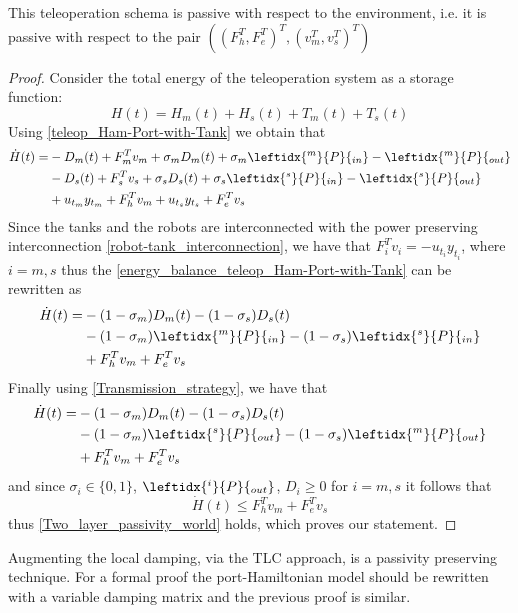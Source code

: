 This teleoperation schema is passive with respect to the environment, i.e. it is passive with respect to the pair $\left(\left(F^{T}_{h} , F^{T}_{e}\right)^T, \left( v^{T}_{m}, v^{T}_{s}\right)^{T} \right)$ 
\begin{proof} \cite{Ferraguti2015}
	Consider the total energy of the teleoperation system as a storage function:
	\begin{equation}
		H(t) = H_{m}(t) + H_{s}(t) + T_{m}(t) + T_{s}(t)
	\end{equation}
	Using \eqref{teleop_Ham-Port-with-Tank} we obtain that
	\begin{equation}\label{energy_balance_teleop_Ham-Port-with-Tank}
		\begin{split}
		\dot{H}(t) = &-D_{m}(t) + F^{T}_{m}v_{m}  +\sigma_{m}D_{m}(t) +\sigma_{m} \leftidx{^m}{P}{_{in}} - \leftidx{^m}{P}{_{out}}\\ 
		&-D_{s}(t) +  F^{T}_{s}v_{s} +\sigma_{s}D_{s}(t) +\sigma_{s} \leftidx{^s}{P}{_{in}} - \leftidx{^s}{P}{_{out}} \\
		& +u_{t_{m}}y_{t_{m}} + F^{T}_{h}v_{m} +u_{t_{s}}y_{t_{s}} + F^{T}_{e}v_{s}
		\end{split}
	\end{equation}	
	Since the tanks and the robots are interconnected with the power preserving interconnection \eqref{robot-tank_interconnection}, we have that $F^{T}_{i}v_{i} = -u_{t_{i}}y_{t_{i}} $, where $i=m,s$ thus the \eqref{energy_balance_teleop_Ham-Port-with-Tank} can be rewritten as
	\begin{equation}
		\begin{split}
			\dot{H}(t) = & -(1 - \sigma_{m})D_{m}(t) - (1 - \sigma_{s})D_{s}(t)\\
									& -(1 - \sigma_{m}) \leftidx{^m}{P}{_{in}} -(1 - \sigma_{s}) \leftidx{^s}{P}{_{in}} \\
									& + F^{T}_{h}v_{m} + F^{T}_{e}v_{s}
		\end{split}
	\end{equation}
	Finally using \eqref{Transmission_strategy}, we have that
	\begin{equation}
	\begin{split}
			\dot{H}(t) = & -(1 - \sigma_{m})D_{m}(t) - (1 - \sigma_{s})D_{s}(t)\\
			& -(1 - \sigma_{m}) \leftidx{^s}{P}{_{out}} -(1 - \sigma_{s}) \leftidx{^m}{P}{_{out}} \\
			& + F^{T}_{h}v_{m} + F^{T}_{e}v_{s}
		\end{split}
	\end{equation}
	and since $\sigma_{i} \in \{0,1\}$, $\leftidx{^i}{P}{_{out}}$, $D_{i} \geq 0$ for $i=m,s$ it follows that
	\begin{equation}
		\dot{H}(t) \leq F^{T}_{h}v_{m} + F^{T}_{e}v_{s}
	\end{equation}
thus \eqref{Two_layer_passivity_world} holds, which proves our statement.
\end{proof}
Augmenting the local damping, via the TLC approach, is a passivity preserving technique. For a formal proof the port-Hamiltonian model should be rewritten with a variable damping matrix and the previous proof is similar.

